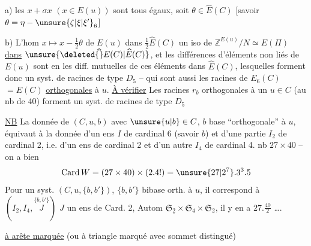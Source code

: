 a) les $x+\sigma x$ $(x\in E(u))$ sont tous égaux, soit $\theta\in\widehat E(C)$ [savoir $\theta=\eta-\unsure{\zeta|\xi|\xi'}_6$]

b) L'hom $x\longmapsto x-\frac12\theta$ de $E(u)$ dans $\frac12\widehat E(C)$  un iso de $\mathbb Z^{E(u)}/N\simeq E(\Pi)$  \uline{dans} $\unsure{\deleted{\widehat{\vphantom E}}E(C)|\widehat E(C)}$, et les différences    d'éléments non liés de $E(u)$ sont  en les diff. mutuelles de ces éléments dans $\widehat E(C)$, lesquelles forment donc un syst. de  racines de type $D_5$ -- qui sont aussi les  racines de $E_6(C)$  $=E(C)$ \uline{orthogonales} à $u$.
\uline{À vérifier} Les racines $r_b$ orthogonales à un $u\in C$ (au nb de 40) forment un syst. de racines de type $D_5$

\uline{NB} La donnée de $(C,u,b)$ avec $\unsure{u|b}\in C$, $b$ base ``orthogonale'' à $u$, équivaut à la donnée d'un ens $I$ de cardinal 6 (savoir $b$) et d'une partie  $I_2$ de cardinal 2, i.e.  d'un ens  de cardinal 2 et d'un autre $I_4$ de cardinal 4.   nb $27\times40$ -- on a bien
\[
\operatorname{Card}W=(27\times40)\times(2.4!)=\unsure{27|2^7}.3^3.5
\]
Pour un syst. $(C,u,\{b,b'\})$, $\{b,b'\}$ bibase orth. à $u$, il correspond à $(I_2,I_4,\overset{\{b,b'\}}{J})$ $J$ un ens de Card. 2, Autom $\mathfrak S_{\underline{2}}\times\mathfrak S_4\times\mathfrak S_2$, il y en a $27.\frac{40}{2}$ \ldots.


\uline{ à arête marquée} (ou à triangle marqué avec sommet distingué)

